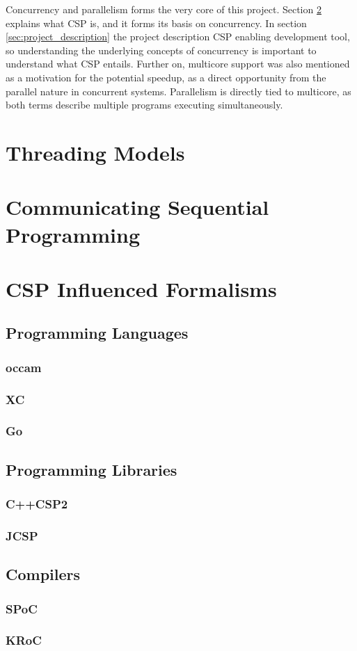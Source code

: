 Concurrency and parallelism forms the very core of this project. Section \ref{sec:csp} explains what CSP is, and it forms its basis on concurrency. In section \ref{sec:project_description} the project description  CSP enabling development tool, so understanding the underlying concepts of concurrency is important to understand what CSP entails. Further on, multicore support was also mentioned as a motivation for the potential speedup, as a direct opportunity from the parallel nature in concurrent systems. Parallelism is directly tied to multicore, as both terms describe multiple programs executing simultaneously. 

\section{Threading Models}

\section{Communicating Sequential Programming}
\label{sec:csp}

\section{CSP Influenced Formalisms}
\label{sec:csp_formalisms}

\subsection{Programming Languages}

\subsubsection*{occam}
\subsubsection*{XC}
\subsubsection*{Go}

\subsection{Programming Libraries}

\subsubsection*{C++CSP2}
\subsubsection*{JCSP}

\subsection{Compilers}

\subsubsection*{SPoC}
\subsubsection*{KRoC}


